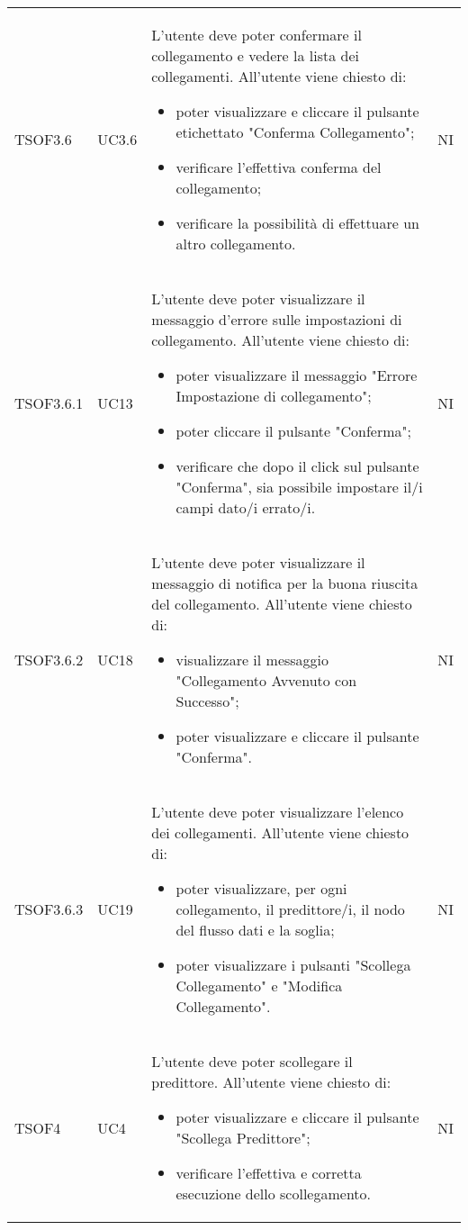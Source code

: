 \begin{longtable}{C{2.5cm} C{2.5cm} L{8cm} C{2cm}}
TSOF3.6 &
UC3.6 &
L'utente  deve poter confermare il collegamento e vedere la lista dei collegamenti. All'utente viene chiesto di:
\begin{itemize}
	\item poter visualizzare e cliccare il pulsante etichettato "Conferma Collegamento";
	\item verificare l'effettiva conferma del collegamento;
	\item verificare la possibilità di effettuare un altro collegamento.
\end{itemize}&
NI \\

TSOF3.6.1 &
UC13 &
L'utente  deve poter visualizzare il messaggio d'errore sulle impostazioni di collegamento. All'utente viene chiesto di:
\begin{itemize}
	\item poter visualizzare il messaggio "Errore Impostazione di collegamento";
	\item poter cliccare il pulsante "Conferma";
	\item verificare che dopo il click sul pulsante "Conferma", sia possibile impostare il/i campi dato/i errato/i.
\end{itemize}&
NI \\
TSOF3.6.2 &
UC18 &
L'utente  deve poter visualizzare il messaggio di notifica per la buona riuscita del collegamento. All'utente viene chiesto di:
\begin{itemize}
	\item visualizzare il messaggio "Collegamento Avvenuto con Successo";
	\item poter visualizzare e cliccare il pulsante "Conferma".
\end{itemize} &
NI \\

TSOF3.6.3 &
UC19 &
L'utente  deve poter visualizzare l'elenco dei collegamenti. All'utente viene chiesto di:
\begin{itemize}
	\item poter visualizzare, per ogni collegamento, il predittore/i, il nodo del flusso dati e la soglia;
	\item poter visualizzare i pulsanti "Scollega Collegamento" e "Modifica Collegamento".
\end{itemize}&
NI \\


TSOF4 &
UC4 &
L'utente  deve poter scollegare il predittore. All'utente viene chiesto di:
\begin{itemize}
	\item poter visualizzare e cliccare il pulsante "Scollega Predittore";
	\item verificare l'effettiva e corretta esecuzione dello scollegamento.
\end{itemize}&
NI \\



\end{longtable}
